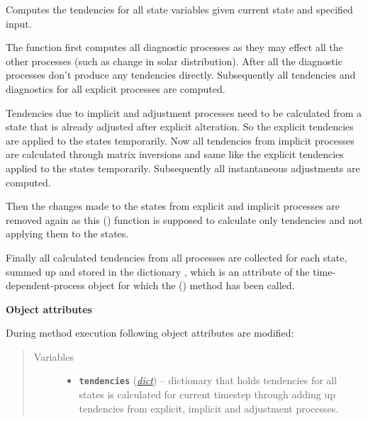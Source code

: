 \documentclass[a4paper,10pt,english]{sphinxmanual}
\begin{document}
\begin{fulllineitems}
\begin{quote}
\begin{description}
\begin{itemize}
\end{itemize}

\end{description}\end{quote}

\begin{fulllineitems}
\label{api/climlab.process:climlab.process.time_dependent_process.TimeDependentProcess.compute}
Computes the tendencies for all state variables given current state 
and specified input.

The function first computes all diagnostic processes as they may effect
all the other processes (such as change in solar distribution).
After all the diagnostic processes don't produce any tendencies directly. Subsequently
all tendencies and diagnostics for all explicit processes are computed.

Tendencies due to implicit and adjustment processes need to be
calculated from a state that is already adjusted after explicit 
alteration. So the explicit tendencies are applied to the states 
temporarily. Now all tendencies from implicit processes are calculated 
through matrix inversions and same like the explicit tendencies applied
to the states temporarily. Subsequently all instantaneous adjustments 
are computed.

Then the changes made to the states from explicit and implicit 
processes are removed again as this {\hyperref[api/climlab.process:climlab.process.time_dependent_process.TimeDependentProcess.compute]{\emph{}}} () function is
supposed to calculate only tendencies and not applying them to the states.

Finally all calculated tendencies from all processes are collected 
for each state, summed up and stored in the dictionary 
, which is an attribute of the time-dependent-process 
object for which the {\hyperref[api/climlab.process:climlab.process.time_dependent_process.TimeDependentProcess.compute]{\emph{}}} () method has been called.

\textbf{Object attributes}

During method execution following object attributes are modified:
\begin{quote}\begin{description}
\item[{Variables}] \leavevmode\begin{itemize}
\item {} 
\textbf{\texttt{tendencies}} (\href{http://docs.python.org/2.7/library/stdtypes.html\#dict}{\emph{dict}}) -- dictionary that holds tendencies for all states
is calculated for current timestep through 
adding up tendencies from explicit, implicit and
adjustment processes.


\end{itemize}
\end{description}
\end{quote}
\end{fulllineitems}
\end{fulllineitems}
\end{document}
